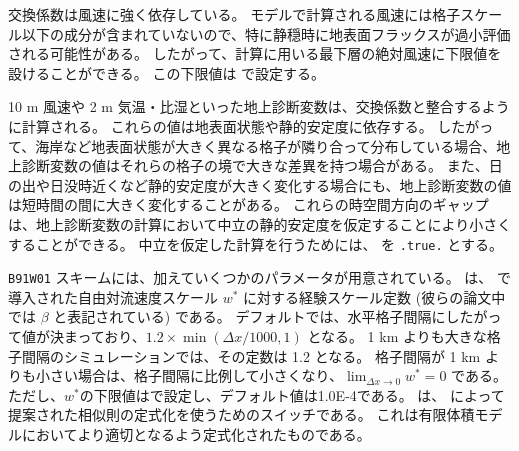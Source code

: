 交換係数は風速に強く依存している。
モデルで計算される風速には格子スケール以下の成分が含まれていないので、特に静穏時に地表面フラックスが過小評価される可能性がある。
したがって、計算に用いる最下層の絶対風速に下限値を設けることができる。
この下限値は  で設定する。

10 m 風速や 2 m 気温・比湿といった地上診断変数は、交換係数と整合するように計算される。
これらの値は地表面状態や静的安定度に依存する。
したがって、海岸など地表面状態が大きく異なる格子が隣り合って分布している場合、地上診断変数の値はそれらの格子の境で大きな差異を持つ場合がある。
また、日の出や日没時近くなど静的安定度が大きく変化する場合にも、地上診断変数の値は短時間の間に大きく変化することがある。
これらの時空間方向のギャップは、地上診断変数の計算において中立の静的安定度を仮定することにより小さくすることができる。
中立を仮定した計算を行うためには、 を \verb|.true.| とする。


\verb|B91W01| スキームには、加えていくつかのパラメータが用意されている。
 は、\citet{beljaars_1994} で導入された自由対流速度スケール $w^{\ast}$ に対する経験スケール定数 (彼らの論文中では $\beta$ と表記されている) である。
デフォルトでは、水平格子間隔にしたがって値が決まっており、$1.2 \times \min(\Delta x/1000, 1)$ となる。
1 km よりも大きな格子間隔のシミュレーションでは、その定数は 1.2 となる。
格子間隔が 1 km よりも小さい場合は、格子間隔に比例して小さくなり、$\lim_{\Delta x\to0}w^{\ast}=0$ である。
ただし、$w^{\ast}$の下限値はで設定し、デフォルト値は1.0E-4である。
 は、\citet{nishizawa_2018} によって提案された相似則の定式化を使うためのスイッチである。
これは有限体積モデルにおいてより適切となるよう定式化されたものである。
